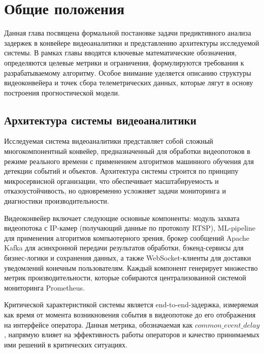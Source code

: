 \chapter{Общие положения}

\hspace*{1.25cm}Данная глава посвящена формальной постановке задачи предиктивного анализа задержек в конвейере видеоаналитики и представлению архитектуры исследуемой системы. В рамках главы вводятся ключевые математические обозначения, определяются целевые метрики и ограничения, формулируются требования к разрабатываемому алгоритму. Особое внимание уделяется описанию структуры видеоконвейера и точек сбора телеметрических данных, которые лягут в основу построения прогностической модели.

\section{Архитектура системы видеоаналитики}

\hspace*{1.25cm}Исследуемая система видеоаналитики представляет собой сложный многокомпонентный конвейер, предназначенный для обработки видеопотоков в режиме реального времени с применением алгоритмов машинного обучения для детекции событий и объектов. Архитектура системы строится по принципу микросервисной организации, что обеспечивает масштабируемость и отказоустойчивость, но одновременно усложняет задачи мониторинга и диагностики производительности.

\hspace*{1.25cm}Видеоконвейер включает следующие основные компоненты: модуль захвата видеопотока с IP-камер (получающий данные по протоколу RTSP), ML-pipeline для применения алгоритмов компьютерного зрения, брокер сообщений Apache Kafka для асинхронной передачи результатов обработки, бэкенд-сервисы для бизнес-логики и сохранения данных, а также WebSocket-клиенты для доставки уведомлений конечным пользователям. Каждый компонент генерирует множество метрик производительности, которые собираются централизованной системой мониторинга Prometheus.

\hspace*{1.25cm}Критической характеристикой системы является end-to-end-задержка, измеряемая как время от момента возникновения события в видеопотоке до его отображения на интерфейсе оператора. Данная метрика, обозначаемая как $common\_event\_delay$, напрямую влияет на эффективность работы операторов и качество принимаемых ими решений в критических ситуациях.

